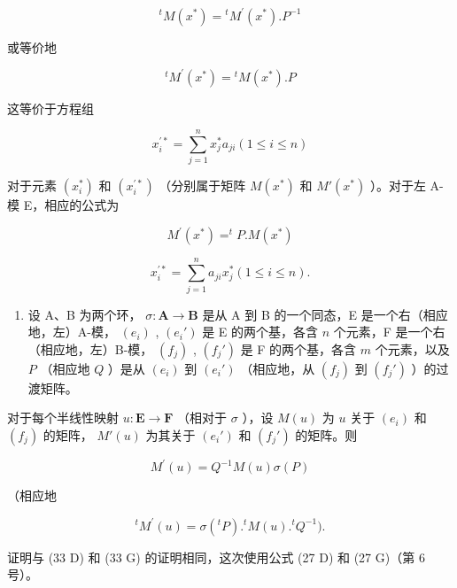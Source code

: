 \[
{ } ^ { t } M ( x ^ { * } ) = { } ^ { t } M ^ { \prime } ( x ^ { * } ) . P ^ { - 1 }
\]

或等价地

\[
{ } ^ { t } M ^ { \prime } ( x ^ { * } ) = { } ^ { t } M ( x ^ { * } ) . P\tag{37 D}
\]

这等价于方程组

\[
x _ {i} ^ {\prime *} = \sum_ {j = 1} ^ {n} x _ {j} ^ {*} a _ {j i} (1 \leqslant i \leqslant n)\tag{38 D}
\]

对于元素 \((x_{i}^{*})\) 和 \((x_{i}^{\prime *})\) （分别属于矩阵 \(M(x^{*})\) 和 \(M'(x^{*})\) ）。对于左 A-模 E，相应的公式为

\[
M ^ {\prime} (x ^ {*}) = ^ {t} P. M (x ^ {*})\tag{37 G}
\]

\[
x _ {i} ^ {\prime *} = \sum_ {j = 1} ^ {n} a _ {j i} x _ {j} ^ {*} (1 \leqslant i \leqslant n).\tag{38 G}
\]

\begin{enumerate}
\def\labelenumi{(\arabic{enumi})}
\setcounter{enumi}{2}
\tightlist
\item
  设 A、B 为两个环， \(\sigma: \mathbf{A} \to \mathbf{B}\) 是从 A 到 B 的一个同态，E 是一个右（相应地，左）A-模， \((e_i)\) , \((e_i')\) 是 E 的两个基，各含 \(n\) 个元素，F 是一个右（相应地，左）B-模， \((f_j)\) , \((f_j')\) 是 F 的两个基，各含 \(m\) 个元素，以及 \(P\) （相应地 \(Q\) ）是从 \((e_i)\) 到 \((e_i')\) （相应地，从 \((f_j)\) 到 \((f_j')\) ）的过渡矩阵。
\end{enumerate}

对于每个半线性映射 \(u: \mathbf{E} \to \mathbf{F}\) （相对于 \(\sigma\) ），设 \(M(u)\) 为 \(u\) 关于 \((e_i)\) 和 \((f_j)\) 的矩阵， \(M'(u)\) 为其关于 \((e_i')\) 和 \((f_j')\) 的矩阵。则

\[
M ^ {\prime} (u) = Q ^ {- 1} M (u) \sigma (P)\tag{39 D}
\]

（相应地

\[
{ } ^ { t } M ^ { \prime } ( u ) = \sigma ( { } ^ { t } P ) . { } ^ { t } M ( u ) . { } ^ { t } Q ^ { - 1 } ) .\tag{39 G}
\]

证明与 (33 D) 和 (33 G) 的证明相同，这次使用公式 (27 D) 和 (27 G)（第 6 号）。

